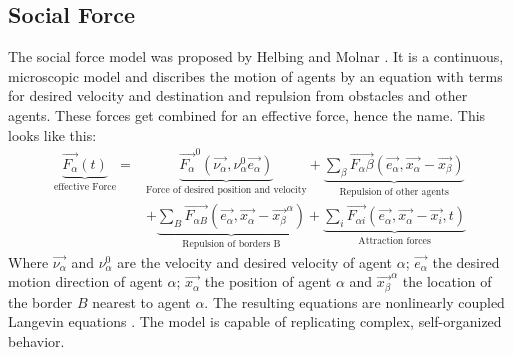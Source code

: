 \subsection{Social Force}
The social force model was proposed by Helbing and Molnar \cite{helbing1995social}.
It is a continuous, microscopic model and discribes the motion of agents by an equation with terms for desired velocity and destination and repulsion from obstacles and other agents.
These forces get combined for an effective force, hence the name. This looks like this:
\begin{equation}
   \begin{split}
      \underbrace{\overrightarrow{F_\alpha}(t)}_\text{effective Force} = & \underbrace{\overrightarrow{F_\alpha}^{0}(\overrightarrow{\nu_\alpha},\nu_\alpha^{0} \overrightarrow{e_\alpha})}_\text{Force of desired position and velocity}
      + \underbrace{\sum\nolimits_{\beta} \overrightarrow{F_\alpha\beta}(\overrightarrow{e_\alpha},\overrightarrow{x_\alpha} - \overrightarrow{x_\beta})}_\text{Repulsion of other agents}
     \\ & + \underbrace{\sum\nolimits_{B} \overrightarrow{F_{\alpha B}}(\overrightarrow{e_\alpha},\overrightarrow{x_\alpha} - \overrightarrow{x_\beta}^{\alpha})}_\text{Repulsion of borders B}
      + \underbrace{\sum\nolimits_{i} \overrightarrow{F_{\alpha i}}(\overrightarrow{e_\alpha},\overrightarrow{x_\alpha} - \overrightarrow{x_i}, t)}_\text{Attraction forces}
   \end{split}
\end{equation} 
Where $ \overrightarrow{\nu_\alpha}$ and $\nu_\alpha^{0}$ are the velocity and desired velocity of agent $\alpha$; 
$ \overrightarrow{e_\alpha}$ the desired motion direction of agent $\alpha$; 
$\overrightarrow{x_\alpha}$ the position of agent $\alpha$ and 
$\overrightarrow{x_\beta}^{\alpha}$ the location of the border $B$ nearest to agent $\alpha$.
The resulting equations are nonlinearly coupled Langevin equations \cite{PhysRevE.51.4282}.
The model is capable of replicating complex, self-organized behavior.  

